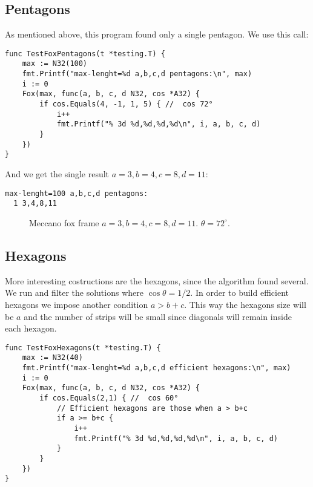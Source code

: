 \documentclass[11pt]{article}
\begin{document}
\subsection{Pentagons}
As mentioned above, this program found only a single pentagon. We use this call:
\begin{lstlisting}
func TestFoxPentagons(t *testing.T) {
	max := N32(100)
	fmt.Printf("max-lenght=%d a,b,c,d pentagons:\n", max)
	i := 0
	Fox(max, func(a, b, c, d N32, cos *A32) {
		if cos.Equals(4, -1, 1, 5) { //  cos 72°
			i++
			fmt.Printf("% 3d %d,%d,%d,%d\n", i, a, b, c, d)
		}
	})
}
\end{lstlisting}
And we get the single result $a=3, b=4, c=8, d=11$:
\begin{lstlisting}
max-lenght=100 a,b,c,d pentagons:
  1 3,4,8,11
\end{lstlisting}

\begin{figure}[h!]
\centering
{}
\caption{Meccano fox frame $a=3,b=4,c=8,d=11$. $\theta=72^\circ$.}
\end{figure}


\subsection{Hexagons}
More interesting costructions are the hexagons, since the algorithm found several.
We run and filter the solutions where $\cos{\theta} = 1/2$. In order to build efficient
hexagons we impose another condition $a > b+c$. This way the hexagons size will be $a$
and the number of strips will be small since diagonals will remain inside each hexagon.

\begin{lstlisting}
func TestFoxHexagons(t *testing.T) {
	max := N32(40)
	fmt.Printf("max-lenght=%d a,b,c,d efficient hexagons:\n", max)
	i := 0
	Fox(max, func(a, b, c, d N32, cos *A32) {
		if cos.Equals(2,1) { //  cos 60°
			// Efficient hexagons are those when a > b+c
			if a >= b+c {
				i++
				fmt.Printf("% 3d %d,%d,%d,%d\n", i, a, b, c, d)
			}
		}
	})
}
\end{lstlisting}
\end{document}
